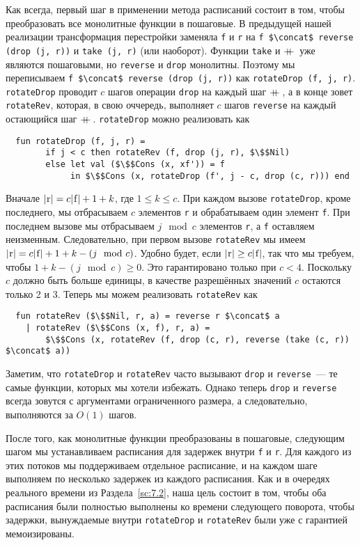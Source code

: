 Как всегда, первый шаг в применении метода расписаний состоит в том,
чтобы преобразовать все монолитные функции в пошаговые. В предыдущей
нашей реализации трансформация перестройки заменяла \lstinline!f! и
\lstinline!r! на 
\lstinline!f $\concat$ reverse (drop (j, r))! и 
\lstinline!take (j, r)! (или наоборот). Функции \lstinline!take! и
$+\!\!\!+\,$ уже являются пошаговыми, но \lstinline!reverse! и
\lstinline!drop! монолитны. Поэтому мы переписываем
\lstinline!f $\concat$ reverse (drop (j, r))! как 
\lstinline!rotateDrop (f, j, r)!. \lstinline!rotateDrop! проводит $c$
шагов операции \lstinline!drop! на каждый шаг $+\!\!\!+\,$, а в конце
зовет \lstinline!rotateRev!, которая, в свою оччередь, выполняет $c$
шагов \lstinline!reverse! на каждый остающийся шаг
$+\!\!\!+\,$. \lstinline!rotateDrop! можно реализовать как
\begin{lstlisting}
  fun rotateDrop (f, j, r) =
        if j < c then rotateRev (f, drop (j, r), $\$$Nil)
        else let val ($\$$Cons (x, xf')) = f
             in $\$$Cons (x, rotateDrop (f', j - c, drop (c, r))) end
\end{lstlisting}
Вначале $|\lstinline!r!| = c|\lstinline!f!| + 1 + k$, где $1 \le k \le
c$. При каждом вызове \lstinline!rotateDrop!, кроме последнего, мы отбрасываем $c$
элементов \lstinline!r! и обрабатываем один элемент \lstinline!f!. При
последнем вызове мы отбрасываем $j \mod c$ элементов \lstinline!r!, а
\lstinline!f! оставляем неизменным. Следовательно, при первом вызове
\lstinline!rotateRev! мы имеем $|\lstinline!r!| = c|\lstinline!f!| + 1
+ k - (j \mod c)$. Удобно будет, если $|\lstinline!r!|
\ge c|\lstinline!f!|$, так что мы требуем, чтобы $1 + k - (j \mod c)
\ge 0$. Это гарантировано только при $c < 4$. Поскольку $c$ должно
быть больше единицы, в качестве разрешённых значений $c$ остаются
только 2 и 3. Теперь мы можем реализовать \lstinline!rotateRev! как
\begin{lstlisting}
  fun rotateRev ($\$$Nil, r, a) = reverse r $\concat$ a
    | rotateRev ($\$$Cons (x, f), r, a) =
        $\$$Cons (x, rotateRev (f, drop (c, r), reverse (take (c, r)) $\concat$ a))
\end{lstlisting}
Заметим, что \lstinline!rotateDrop! и \lstinline!rotateRev! часто
вызывают \lstinline!drop! и \lstinline!reverse!~--- те самые функции,
которых мы хотели избежать. Однако теперь \lstinline!drop! и
\lstinline!reverse! всегда зовутся с аргументами ограниченного
размера, а следовательно, выполняются за $O(1)$ шагов.

После того, как монолитные функции преобразованы в пошаговые,
следующим шагом мы устанавливаем расписания для задержек внутри
\lstinline!f! и \lstinline!r!. Для каждого из этих потоков мы
поддерживаем отдельное расписание, и на каждом шаге выполняем по
несколько задержек из каждого расписания. Как и в очередях реального
времени из Раздела~\ref{sc:7.2}, наша цель состоит в том, чтобы оба
расписания были полностью выполнены ко времени следующего поворота,
чтобы задержки, вынуждаемые внутри \lstinline!rotateDrop! и
\lstinline!rotateRev! были уже с гарантией мемоизированы.

